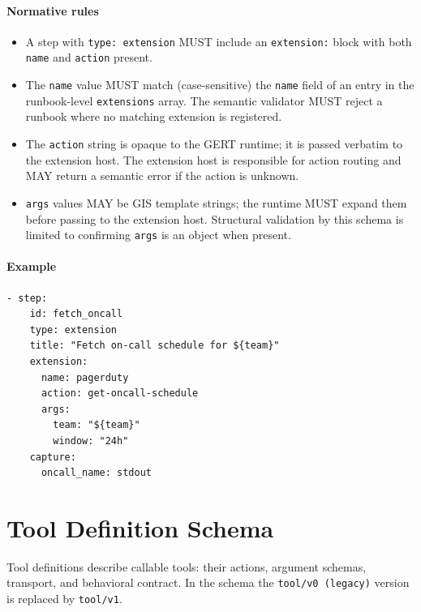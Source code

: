 \paragraph{Normative rules}

\begin{itemize}
  \item A step with \texttt{type:\ extension} MUST include an \texttt{extension:}
        block with both \texttt{name} and \texttt{action} present.
  \item The \texttt{name} value MUST match (case-sensitive) the \texttt{name}
        field of an entry in the runbook-level \texttt{extensions} array.
        The semantic validator MUST reject a runbook where no matching extension
        is registered.
  \item The \texttt{action} string is opaque to the GERT runtime; it is
        passed verbatim to the extension host.  The extension host is responsible
        for action routing and MAY return a semantic error if the action is
        unknown.
  \item \texttt{args} values MAY be GIS template strings; the runtime MUST
        expand them before passing to the extension host.  Structural validation
        by this schema is limited to confirming \texttt{args} is an object when
        present.
\end{itemize}

\paragraph{Example}

\begin{verbatim}
- step:
    id: fetch_oncall
    type: extension
    title: "Fetch on-call schedule for ${team}"
    extension:
      name: pagerduty
      action: get-oncall-schedule
      args:
        team: "${team}"
        window: "24h"
    capture:
      oncall_name: stdout
\end{verbatim}

\section{Tool Definition Schema}
\label{sec:tool-schema}

Tool definitions describe callable tools: their actions, argument schemas,
transport, and behavioral contract.  In the schema the \texttt{tool/v0 (legacy)} version is
replaced by \texttt{tool/v1}.


